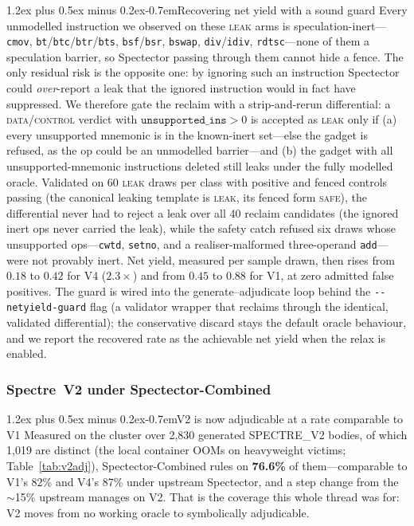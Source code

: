 \documentclass[conference]{IEEEtran}
\makeatletter
\renewcommand\paragraph{\@startsection{paragraph}{4}{\z@}%
  {1.2ex plus 0.5ex minus 0.2ex}{-0.7em}{\normalfont\normalsize\bfseries}}
\makeatother
\begin{document}
\paragraph{Recovering net yield with a sound guard}
Every unmodelled instruction we observed on these \textsc{leak} arms is
speculation-inert---\texttt{cmov}, \texttt{bt}/\texttt{btc}/\texttt{btr}/\texttt{bts},
\texttt{bsf}/\texttt{bsr}, \texttt{bswap}, \texttt{div}/\texttt{idiv},
\texttt{rdtsc}---none of them a speculation barrier, so Spectector passing
through them cannot hide a fence. The only residual risk is the opposite one:
by ignoring such an instruction Spectector could \emph{over}-report a leak that
the ignored instruction would in fact have suppressed. We therefore gate the
reclaim with a strip-and-rerun differential: a \textsc{data}/\textsc{control}
verdict with $\texttt{unsupported\_ins}>0$ is accepted as \textsc{leak} only if
(a) every unsupported mnemonic is in the known-inert set---else the gadget is
refused, as the op could be an unmodelled barrier---and (b) the gadget with all
unsupported-mnemonic instructions deleted still leaks under the fully modelled
oracle. Validated on 60 \textsc{leak} draws per class with positive and
fenced controls passing (the canonical leaking template is \textsc{leak}, its
fenced form \textsc{safe}), the differential never had to reject a leak over all
40 reclaim candidates (the ignored inert ops never carried the leak), while the
safety catch refused six draws whose unsupported ops---\texttt{cwtd},
\texttt{setno}, and a realiser-malformed three-operand \texttt{add}---were not
provably inert. Net yield, measured per sample drawn, then rises from $0.18$ to
$0.42$ for V4 ($2.3\times$) and from $0.45$ to $0.88$ for V1, at zero admitted
false positives. The guard is wired into the generate--adjudicate loop behind
the \texttt{-{}-netyield-guard} flag (a validator wrapper that reclaims through
the identical, validated differential); the conservative discard stays the
default oracle behaviour, and we report the recovered rate as the achievable
net yield when the relax is enabled.

\subsubsection{Spectre~V2 under Spectector-Combined}
\label{sec:v2results}
\paragraph{V2 is now adjudicable at a rate comparable to V1} Measured on the
cluster over 2{,}830 generated SPECTRE\_V2 bodies, of which 1{,}019 are distinct (the local container OOMs on
heavyweight victims; Table~\ref{tab:v2adj}), Spectector-Combined rules on
\textbf{76.6\%} of them---comparable to V1's 82\% and V4's 87\% under
upstream Spectector, and a step change from the $\sim$15\% upstream manages on
V2. That is the coverage this whole thread was for: V2 moves from no working
oracle to symbolically adjudicable.
\end{document}
